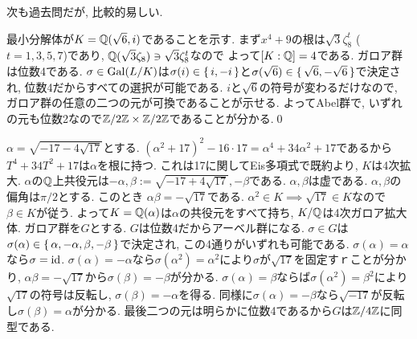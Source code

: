 次も過去問だが, 比較的易しい.
\begin{egans}
最小分解体が$K=\mathbb{Q}(\sqrt{6}, i)$であることを示す. まず$x^4 + 9$の根は$\sqrt{3}\zeta_8^{t}$ ($t=1,3,5,7$)であり, $\mathbb{Q}(\sqrt{3}\zeta_8)\ni \sqrt{3}\zeta_8^{t}$なので
よって$[K:\mathbb{Q}] = 4$である. ガロア群は位数4である. $\sigma\in \mathrm{Gal}(L/K)$は$\sigma(i) \in \set{i,-i}$と$\sigma(\sqrt{6}) \in \set{\sqrt{6}, -\sqrt{6}}$で決定され, 位数4だからすべての選択が可能である. $i$と$\sqrt{6}$の符号が変わるだけなので, ガロア群の任意の二つの元が可換であることが示せる. よってAbel群で, いずれの元も位数2なので$\mathbb{Z}/2\mathbb{Z}\times \mathbb{Z}/2\mathbb{Z}$であることが分かる.\qed
\end{egans}




\begin{egans}
$\alpha = \sqrt{-17-4\sqrt{17}}$とする.
$(\alpha^2 + 17)^2 -16\cdot 17 = \alpha^4 + 34\alpha^2 + 17 $であるから$T^4+34T^2+17$は$\alpha$を根に持つ. これは17に関してEis多項式で既約より, $K$は4次拡大. $\alpha$の$\mathbb{Q}$上共役元は$-\alpha, \beta:=\sqrt{-17 + 4\sqrt{17}}, -\beta$である. $\alpha,\beta$は虚である. $\alpha,\beta$の偏角は$\pi/2$とする. このとき
$\alpha\beta = - \sqrt{17}$である. $\alpha^2 \in K\implies \sqrt{17}\in K$なので$\beta\in K$が従う. よって$K=\mathbb{Q}(\alpha)$は$\alpha$の共役元をすべて持ち, $K/\mathbb{Q}$は4次ガロア拡大体. ガロア群を$G$とする. $G$は位数4だからアーベル群になる. $\sigma\in G$は$\sigma(\alpha)\in\set{\alpha,-\alpha,\beta,-\beta}$で決定され, この4通りがいずれも可能である. $\sigma(\alpha) = \alpha$なら$\sigma=\mathrm{id}$. $\sigma(\alpha) = -\alpha$なら$\sigma(\alpha^2) = \alpha^2$により$\sigma$が$\sqrt{17}$を固定すｒことが分かり, $\alpha\beta=-\sqrt{17}$から$\sigma(\beta)=-\beta$が分かる. $\sigma(\alpha) = \beta$ならば$\sigma(\alpha^2) = \beta^2$により$\sqrt{17}$の符号は反転し, $\sigma(\beta) = -\alpha$を得る. 同様に$\sigma(\alpha) = -\beta$なら$\sqrt{-17}$が反転し$\sigma(\beta) = \alpha$が分かる. 最後二つの元は明らかに位数4であるから$G$は$\mathbb{Z}/4\mathbb{Z}$に同型である.
\end{egans}

